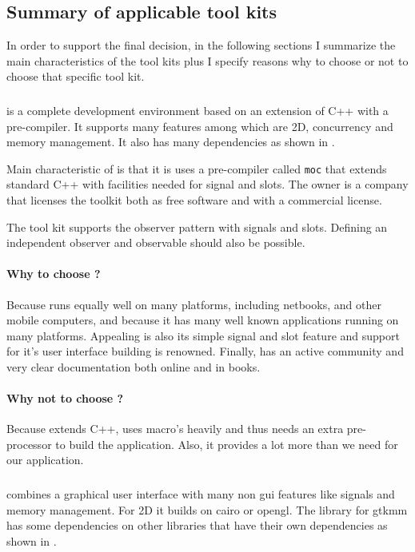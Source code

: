 \subsection{Summary of applicable tool kits}

In order to support the final decision, in the following sections I summarize 
the main characteristics of the tool kits plus I specify reasons why to choose or 
not to choose that specific tool kit.

\subsubsection{} 
 is a complete development environment based on an extension of C++ with a
 pre-compiler. It supports many features among which are 2D, concurrency 
and memory management. It also has many dependencies as shown in \cite{qt:qt-dep}.

Main characteristic of  is that it is uses a pre-compiler called \texttt{moc}
that extends standard C++ with facilities needed for signal and slots. The owner is a 
company  that licenses the  toolkit both as free software and 
with a commercial license.

The tool kit  supports the observer pattern with signals and slots. 
Defining an independent observer and observable should also be possible.

\paragraph{Why to choose ?} Because  runs equally well on many platforms,
including netbooks, and other mobile computers, and because it has many well known
applications running on many platforms. Appealing is also its simple
signal and slot feature and support for it's user interface building is renowned.
Finally,  has an active community and very clear documentation both
online and in books. 

\paragraph{Why not to choose ?} Because  extends C++, uses macro's heavily
and thus needs an extra pre-processor to build the application. Also, it provides a lot
more than we need for our application.

\subsubsection{}
 combines a graphical user interface with many non gui features like signals 
and memory management. For 2D it builds on cairo or opengl. The library for 
gtkmm has some dependencies on other libraries that have their own dependencies
as shown in \cite{gtkmm:gtk+-dep}.

